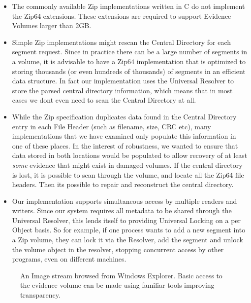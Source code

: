 \documentclass[10pt, conference]{IEEEtran}
\begin{document}
{{\begin{itemize}
\item The commonly available Zip implementations written in C do not
 implement the Zip64 extensions. These extensions are required to
 support Evidence Volumes larger than 2GB.

\item Simple Zip implementations might rescan the
  Central Directory for each segment request. Since in practice there
  can be a large number of segments in a volume, it is advisable to
  have a Zip64 implementation that is optimized to storing thousands
  (or even hundreds of thousands) of segments in an efficient data
  structure. In fact our implementation uses the Universal Resolver to
  store the parsed central directory information, which means that in
  most cases we dont even need to scan the Central Directory at all.

\item While the Zip specification duplicates data found in the Central
  Directory entry in each File Header (such as filename, size, CRC
  etc), many implementations that we have examined only populate this
  information in one of these places. In the interest of robustness,
  we wanted to ensure that data stored in both locations would be
  populated to allow recovery of at least \emph{some} evidence that
  might exist in damaged volumes. If the central directory is lost, it
  is possible to scan through the volume, and locate all the Zip64
  file headers. Then its possible to repair and reconstruct the
  central directory.

\item Our implementation supports simultaneous access by multiple
  readers and writers. Since our system requires all metadata to be
  shared through the Universal Resolver, this lends itself to
  providing Universal Locking on a per Object basis. So for example,
  if one process wants to add a new segment into a Zip volume, they
  can lock it via the Resolver, add the segment and unlock the volume
  object in the resolver, stopping concurrent access by other
  programs, even on different machines.
\end{itemize}

\begin{figure}[tbp]
  \begin{center}
  \mbox{\columnwidth {}}

  \caption{An Image stream browsed from Windows Explorer.  Basic
  access to the evidence volume can be made using familiar tools
  improving transparency.}


\end{center}
\end{figure}}}
\end{document}
